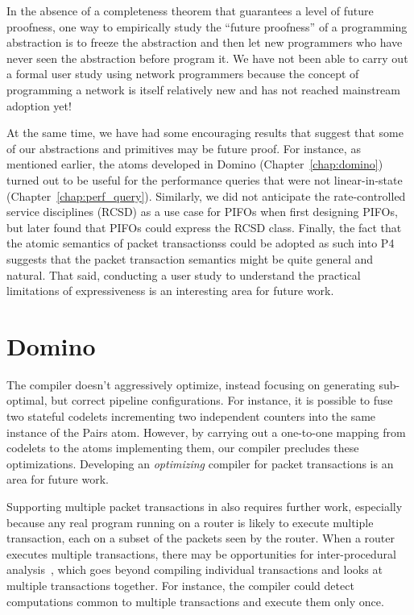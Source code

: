  In the absence of a completeness theorem that
guarantees a level of future proofness, one way to empirically study the
``future proofness'' of a programming abstraction is to freeze the abstraction
and then let new programmers who have never seen the abstraction before program
it. We have not been able to carry out a formal user study using network
programmers because the concept of programming a network is itself relatively
new and has not reached mainstream adoption yet!

At the same time, we have had some encouraging results that suggest that some
of our abstractions and primitives may be future proof. For instance, as
mentioned earlier, the atoms developed in Domino (Chapter~\ref{chap:domino})
turned out to be useful for the performance queries that were not
linear-in-state (Chapter~\ref{chap:perf_query}). Similarly, we did not
anticipate the rate-controlled service disciplines (RCSD) as a use case for
PIFOs when first designing PIFOs, but later found that PIFOs could express the
RCSD class. Finally, the fact that the atomic semantics of  packet
transactionss could be adopted as such into P4 suggests that the packet
transaction semantics might be quite general and natural. That said, conducting
a user study to understand the practical limitations of expressiveness is an
interesting area for future work.



\section{Domino}
\label{sec:domino_limitations}
The \pktlanguage compiler doesn't aggressively optimize, instead focusing on
generating sub-optimal, but correct pipeline configurations. For instance, it is
possible to fuse two stateful codelets incrementing two independent counters
into the same instance of the Pairs atom. However, by carrying out a one-to-one
mapping from codelets to the atoms implementing them, our compiler precludes
these optimizations.  Developing an {\em optimizing} compiler for packet
transactions is an area for future work.

Supporting multiple packet transactions in \pktlanguage also requires further
work, especially because any real program running on a router is likely to
execute multiple transaction, each on a subset of the packets seen by the
router. When a router executes multiple transactions, there may be
opportunities for inter-procedural analysis~\cite{dragonbook}, which goes
beyond compiling individual transactions and looks at multiple transactions
together.  For instance, the compiler could detect computations common to
multiple transactions and execute them only once.

